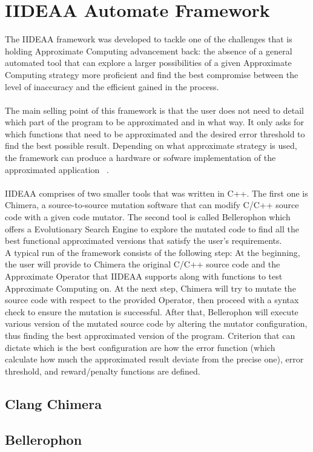 \section{IIDEAA Automate Framework} 

The IIDEAA framework was developed to tackle one of the challenges that is holding Approximate Computing advancement back: the absence of a general automated tool that can explore a larger possibilities of a given Approximate Computing strategy more proficient and find the best compromise between the level of inaccuracy and the efficient gained in the process. \\
~\\
The main selling point of this framework is that the user does not need to detail which part of the program to be approximated and in what way. It only asks for which functions that need to be approximated and the desired error threshold to find the best possible result. Depending on what approximate strategy is used, the framework can produce a hardware or sofware implementation of the approximated application ~\cite{iideaa}. \\
~\\
IIDEAA comprises of two smaller tools that was written in C++. The first one is Chimera, a source-to-source mutation software that can modify C/C++ source code with a given code mutator. The second tool is called Bellerophon which offers a Evolutionary Search Engine to explore the mutated code to find all the best functional approximated versions that satisfy the user's requirements. \\
A typical run of the framework consists of the following step: At the beginning, the user will provide to Chimera the original C/C++ source code  and the Approximate Operator that IIDEAA supports along with functions to test Approximate Computing on. At the next step, Chimera will try to mutate the source code with respect to the provided Operator, then proceed with a syntax check to ensure the mutation is successful. After that, Bellerophon will execute various version of the mutated source code by altering the mutator configuration, thus finding the best approximated version of the program. Criterion that can dictate which is the best configuration are how the error function (which calculate how much the approximated result deviate from the precise one), error threshold, and reward/penalty functions are defined. \\

\subsection{Clang Chimera}

\subsection{Bellerophon}
